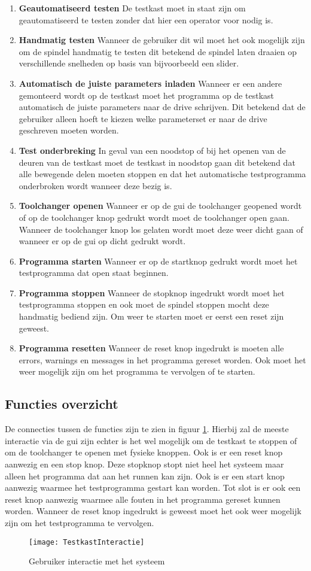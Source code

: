 \begin{enumerate}
	\item \textbf{Geautomatiseerd testen} De testkast moet in staat zijn om geautomatiseerd te testen zonder dat hier een operator voor nodig is.
	\item \textbf{Handmatig testen} Wanneer de gebruiker dit wil moet het ook mogelijk zijn om de spindel handmatig te testen dit betekend de spindel laten draaien op verschillende snelheden op basis van bijvoorbeeld een slider.
	\item \textbf{Automatisch de juiste parameters inladen} Wanneer er een andere gemonteerd wordt op de testkast moet het programma op de testkast automatisch de juiste parameters naar de drive schrijven. Dit betekend dat de gebruiker alleen hoeft te kiezen welke parameterset er naar de drive geschreven moeten worden.
	\item \textbf{Test onderbreking} In geval van een noodstop of bij het openen van de deuren van de testkast moet de testkast in noodstop gaan dit betekend dat alle bewegende delen moeten stoppen en dat het automatische testprogramma onderbroken wordt wanneer deze bezig is.
	\item \textbf{Toolchanger openen} Wanneer er op de \gls{gui} de toolchanger geopened wordt of op de toolchanger knop gedrukt wordt moet de toolchanger open gaan. Wanneer de toolchanger knop los gelaten wordt moet deze weer dicht gaan of wanneer er op de \gls{gui} op dicht gedrukt wordt.
	\item \textbf{Programma starten} Wanneer er op de startknop gedrukt wordt moet het testprogramma dat open staat beginnen.
	\item \textbf{Programma stoppen} Wanneer de stopknop ingedrukt wordt moet het testprogramma stoppen en ook moet de spindel stoppen mocht deze handmatig bediend zijn. Om weer te starten moet er eerst een reset zijn geweest.
	\item \textbf{Programma resetten} Wanneer de reset knop ingedrukt is moeten alle errors, warnings en messages in het programma gereset worden. Ook moet het weer mogelijk zijn om het programma te vervolgen of te starten.
\end{enumerate}

\newpage

\subsection{Functies overzicht}

De connecties tussen de functies zijn te zien in  figuur \ref{fig:TestkastInteractie}. Hierbij zal de meeste interactie via de \gls{gui} zijn echter is het wel mogelijk om de testkast te stoppen of om de toolchanger te openen met fysieke knoppen. Ook is er een reset knop aanwezig en een stop knop. Deze stopknop stopt niet heel het systeem maar alleen het programma dat aan het runnen kan zijn. Ook is er een start knop aanwezig waarmee het testprogramma gestart kan worden. Tot slot is er ook een reset knop aanwezig waarmee alle fouten in het programma gereset kunnen worden. Wanneer de reset knop ingedrukt is geweest moet het ook weer mogelijk zijn om het testprogramma te vervolgen.

\begin{figure}[H]
	\centering
	\texttt{[image: TestkastInteractie]}
	\label{fig:TestkastInteractie}
	\caption{Gebruiker interactie met het systeem}
\end{figure}
